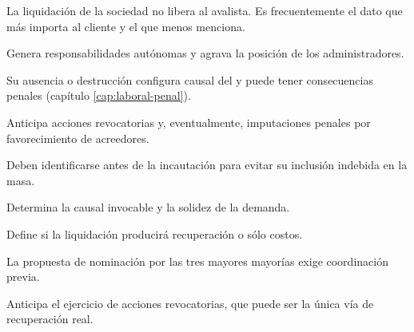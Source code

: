 \bloqueEntrevista

\begin{cuestionario}
  {La liquidación de la sociedad no libera al avalista. Es frecuentemente el dato que más
  importa al cliente y el que menos menciona.}

  {Genera responsabilidades autónomas y agrava la posición de los administradores.}

  {Su ausencia o destrucción configura causal del  y puede tener consecuencias
  penales (capítulo \ref{cap:laboral-penal}).}

  {Anticipa acciones revocatorias y, eventualmente, imputaciones penales por
  favorecimiento de acreedores.}

  {Deben identificarse antes de la incautación para evitar su inclusión indebida en la
  masa.}
\end{cuestionario}

\begin{cuestionario}
  {Determina la causal invocable y la solidez de la demanda.}

  {Define si la liquidación producirá recuperación o sólo costos.}

  {La propuesta de nominación por las tres mayores mayorías exige coordinación previa.}

  {Anticipa el ejercicio de acciones revocatorias, que puede ser la única vía de
  recuperación real.}
\end{cuestionario}

\bloqueDocumental

